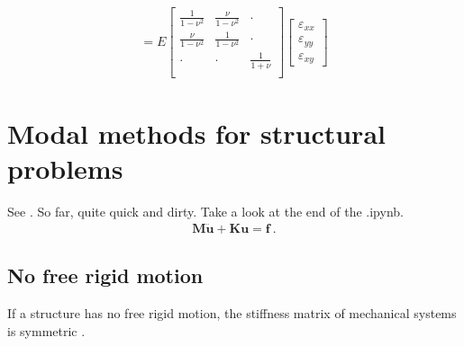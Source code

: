 \documentclass[letterpaper,10pt,english]{jupyterBook}
\begin{document}
\begin{equation*}
\begin{split}
=
E
\begin{bmatrix}
 \frac{  1}{1-\nu^2} & \frac{\nu}{1-\nu^2} & \cdot \\
 \frac{\nu}{1-\nu^2} & \frac{  1}{1-\nu^2} & \cdot \\
 \cdot & \cdot &         \frac{1}{1+\nu} \\
\end{bmatrix}
\begin{bmatrix} \varepsilon_{xx} \\ \varepsilon_{yy} \\ \varepsilon_{xy} \end{bmatrix}
\end{split}
\end{equation*}
\sphinxstepscope


\chapter{Modal methods for structural problems}
\label{\detokenize{ch/solids/small-displacements-numerics:modal-methods-for-structural-problems}}\label{\detokenize{ch/solids/small-displacements-numerics:solid-mechanics-intro-small-displacements-numerics}}\label{\detokenize{ch/solids/small-displacements-numerics::doc}}
\sphinxAtStartPar
See . So far, quite quick and dirty. Take a look at the end of the .ipynb.
\begin{equation*}
\begin{split}\mathbf{M} \ddot{\mathbf{u}} + \mathbf{K} \mathbf{u} = \mathbf{f} \ .\end{split}
\end{equation*}

\section{No free rigid motion}
\label{\detokenize{ch/solids/small-displacements-numerics:no-free-rigid-motion}}
\sphinxAtStartPar
If a structure has no free rigid motion, the stiffness matrix of mechanical systems is symmetric .
\end{document}
